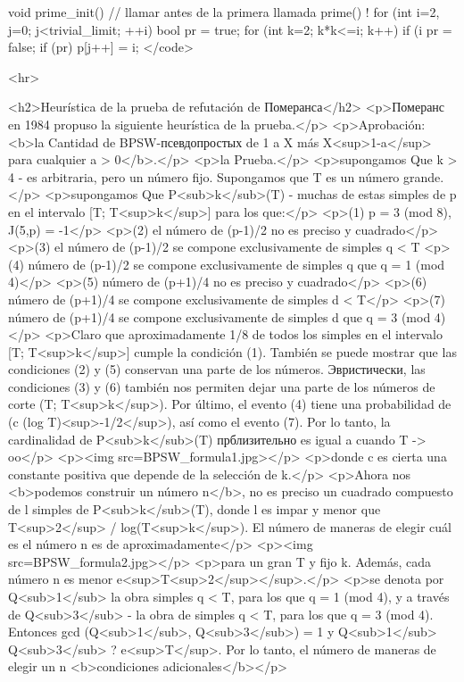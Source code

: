 void prime_init() { // llamar antes de la primera llamada prime() !
for (int i=2, j=0; j<trivial_limit; ++i) {
bool pr = true;
for (int k=2; k*k<=i; k++)
if (i %
pr = false;
if (pr)
p[j++] = i;
}
}</code>

<hr>

<h2>Heurística de la prueba de refutación de Померанса</h2>
<p>Померанс en 1984 propuso la siguiente heurística de la prueba.</p>
<p>Aprobación: <b>la Cantidad de BPSW-псевдопростых de 1 a X más X<sup>1-a</sup> para cualquier a > 0</b>.</p>
<p>la Prueba.</p>
<p>supongamos Que k > 4 - es arbitraria, pero un número fijo. Supongamos que T es un número grande.</p>
<p>supongamos Que P<sub>k</sub>(T) - muchas de estas simples de p en el intervalo [T; T<sup>k</sup>] para los que:</p>
<p>(1) p = 3 (mod 8), J(5,p) = -1</p>
<p>(2) el número de (p-1)/2 no es preciso y cuadrado</p>
<p>(3) el número de (p-1)/2 se compone exclusivamente de simples q < T
<p>(4) número de (p-1)/2 se compone exclusivamente de simples q que q = 1 (mod 4)</p>
<p>(5) número de (p+1)/4 no es preciso y cuadrado</p>
<p>(6) número de (p+1)/4 se compone exclusivamente de simples d < T</p>
<p>(7) número de (p+1)/4 se compone exclusivamente de simples d que q = 3 (mod 4)</p>
<p>Claro que aproximadamente 1/8 de todos los simples en el intervalo [T; T<sup>k</sup>] cumple la condición (1). También se puede mostrar que las condiciones (2) y (5) conservan una parte de los números. Эвристически, las condiciones (3) y (6) también nos permiten dejar una parte de los números de corte (T; T<sup>k</sup>). Por último, el evento (4) tiene una probabilidad de (c (log T)<sup>-1/2</sup>), así como el evento (7). Por lo tanto, la cardinalidad de P<sub>k</sub>(T) прблизительно es igual a cuando T -> oo</p>
<p><img src=BPSW_formula1.jpg></p>
<p>donde c es cierta una constante positiva que depende de la selección de k.</p>
<p>Ahora nos <b>podemos construir un número n</b>, no es preciso un cuadrado compuesto de l simples de P<sub>k</sub>(T), donde l es impar y menor que T<sup>2</sup> / log(T<sup>k</sup>). El número de maneras de elegir cuál es el número n es de aproximadamente</p>
<p><img src=BPSW_formula2.jpg></p>
<p>para un gran T y fijo k. Además, cada número n es menor e<sup>T<sup>2</sup></sup>.</p>
<p>se denota por Q<sub>1</sub> la obra simples q < T, para los que q = 1 (mod 4), y a través de Q<sub>3</sub> - la obra de simples q < T, para los que q = 3 (mod 4). Entonces gcd (Q<sub>1</sub>, Q<sub>3</sub>) = 1 y Q<sub>1</sub> Q<sub>3</sub> ? e<sup>T</sup>. Por lo tanto, el número de maneras de elegir un n <b>condiciones adicionales</b></p>
